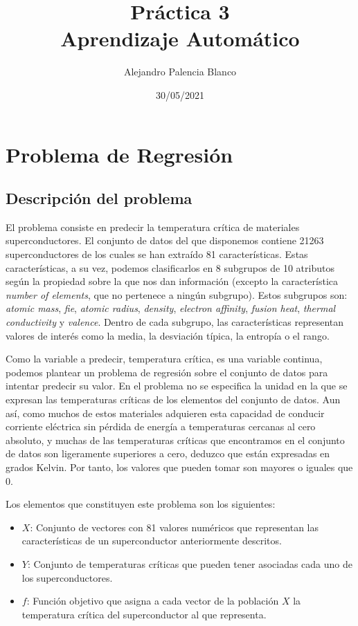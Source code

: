 \documentclass[10pt,a4paper]{article}
\title{
Práctica 3\\
\large Aprendizaje Automático \\
}
\author{
Alejandro Palencia Blanco\\
}
\date{30/05/2021}
\begin{document}
\maketitle

\newpage

\tableofcontents

\newpage

\section{Problema de Regresión}

\subsection{Descripción del problema}

El problema consiste en predecir la temperatura crítica de materiales superconductores. El conjunto de datos del que disponemos contiene 21263 superconductores de los cuales se han extraído 81 características. Estas características, a su vez, podemos clasificarlos en 8 subgrupos de 10 atributos según la propiedad sobre la que nos dan información (excepto la característica \textit{number of elements}, que no pertenece a ningún subgrupo). Estos subgrupos son: \textit{atomic mass}, \textit{fie}, \textit{atomic radius}, \textit{density}, \textit{electron affinity}, \textit{fusion heat}, \textit{thermal conductivity} y \textit{valence}. Dentro de cada subgrupo, las características representan valores de interés como la media, la desviación típica, la entropía o el rango.

Como la variable a predecir, temperatura crítica, es una variable continua, podemos plantear un problema de regresión sobre el conjunto de datos para intentar predecir su valor. En el problema no se especifica la unidad en la que se expresan las temperaturas críticas de los elementos del conjunto de datos. Aun así, como muchos de estos materiales adquieren esta capacidad de conducir corriente eléctrica sin pérdida de energía a temperaturas cercanas al cero absoluto, y muchas de las temperaturas críticas que encontramos en el conjunto de datos son ligeramente superiores a cero, deduzco que están expresadas en grados Kelvin. Por tanto, los valores que pueden tomar son mayores o iguales que 0.

Los elementos que constituyen este problema son los siguientes:

\begin{itemize}
	\item $X$: Conjunto de vectores con 81 valores numéricos que representan las características de un superconductor anteriormente descritos.
	\item $Y$: Conjunto de temperaturas críticas que pueden tener asociadas cada uno de los superconductores.
	\item $f$: Función objetivo que asigna a cada vector de la población $X$ la temperatura crítica del superconductor al que representa.
\end{itemize}
\end{document}
